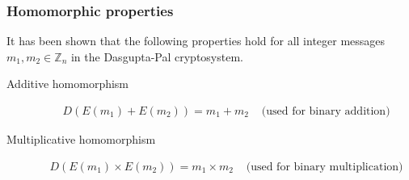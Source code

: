 \subsubsection{Homomorphic properties}
It has been shown \cite{dasgupta_design_2016} that the following properties hold for all integer messages $m_1, m_2 \in \mathbb{Z}_n$ in the Dasgupta-Pal cryptosystem.
\begin{description}
  \item[Additive homomorphism]
  \begin{align*}
    D(E(m_1) + E(m_2))= m_1+m_2 & \text{ (used for binary addition)}
  \end{align*}
  \item[Multiplicative homomorphism]
  \begin{align*}
    D(E(m_1) \times E(m_2))= m_1 \times m_2 & \text{ (used for binary multiplication)}
  \end{align*}
\end{description}

\section{}
